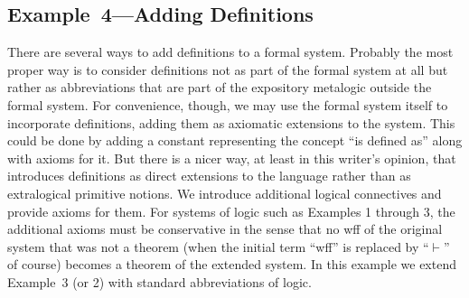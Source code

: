\subsection{Example~4---Adding Definitions}
There are several ways to add definitions to a formal system.  Probably the
most proper way is to consider definitions not as part of the formal system at
all but rather as abbreviations that are part of the expository metalogic
outside the formal system.  For convenience, though, we may use the formal
system itself to incorporate definitions, adding them as axiomatic extensions
to the system.  This could be done by adding a constant representing the
concept ``is defined as'' along with axioms for it. But there is a nicer way,
at least in this writer's opinion, that introduces definitions as direct
extensions to the language rather than as extralogical primitive notions.  We
introduce additional logical connectives and provide axioms for them.  For
systems of logic such as Examples 1 through 3, the additional axioms must be
conservative in the sense that no wff of the original system that was not a
theorem (when the initial term ``wff'' is replaced by ``$\vdash$'' of course)
becomes a theorem of the extended system.  In this example we extend Example~3
(or 2) with standard abbreviations of logic.

